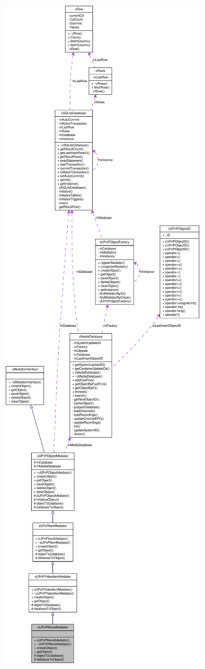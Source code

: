 \begin{figure}[H]
\begin{center}
\leavevmode
\includegraphics[width=400pt]{classcUPnPMovieMediator__coll__graph}
\end{center}
\end{figure}
